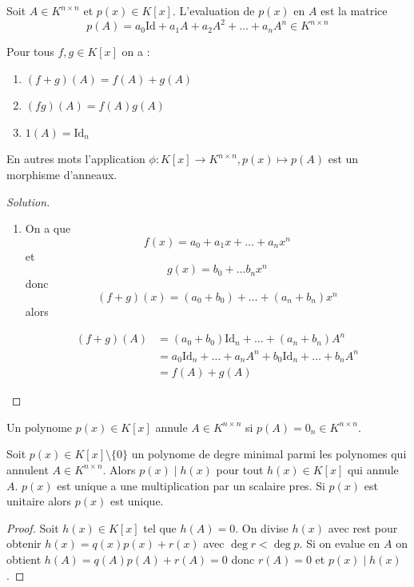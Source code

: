 \begin{definition}
Soit $A\in K^{n\times n}$ et $p(x)\in K[x]$. L'evaluation de $p(x)$ en $A$ est la matrice 
$$
p(A)=a_{0}\mathrm{Id}+a_{1}A+a_{2}A^{2}+\dots+a_{n}A^{n}\in K^{n\times n}
$$
\end{definition}
\begin{exercise}
Pour tous $f,g\in K[x]$ on a :
\begin{enumerate}
\item $(f+g)(A)=f(A)+g(A)$
\item $(fg)(A)=f(A)g(A)$
\item $1(A)=\mathrm{Id}_{n}$
\end{enumerate}
En autres mots l'application $\phi:K[x]\to K^{n\times n},p(x)\mapsto p(A)$ est un morphisme d'anneaux. 
\end{exercise}
\begin{proof}[Solution]
\begin{enumerate}
\item On a que 
$$
f(x)=a_{0}+a_{1}x+\dots +a_{n}x^{n}
$$
et
$$
g(x)=b_{0}+\dots b_{n}x^{n}
$$
donc 
$$
(f+g)(x)=(a_{0}+b_{0})+\dots +(a_{n}+b_{n})x^{n}
$$
alors

\begin{align*}
(f+g)(A) & =(a_{0}+b_{0})\mathrm{Id}_{n}+\dots +(a_{n}+b_{n})A^{n} \\
 & =a_{0}\mathrm{Id}_{n}+\dots +a_{n}A^{n}+b_{0}\mathrm{Id}_{n} +\dots +b_{n}A^{n} \\
 & =f(A)+g(A)
\end{align*}

\end{enumerate}
\end{proof}

\begin{definition}
Un polynome $p(x)\in K[x]$ annule $A\in K^{n\times n}$ si $p(A)=0_{n}\in K^{n\times n}$.
\end{definition}
\begin{theorem}\label{thm2}
Soit $p(x)\in K[x]\setminus \{ 0 \}$ un polynome de degre minimal parmi les polynomes qui annulent $A\in K^{n\times n}$. Alors $p(x)\mid h(x)$ pour tout $h(x)\in K[x]$ qui annule $A$. $p(x)$ est unique a une multiplication par un scalaire pres. Si $p(x)$ est unitaire alors $p(x)$ est unique.  
\end{theorem}
\begin{proof}
Soit $h(x)\in K[x]$ tel que $h(A)=0$. On divise $h(x)$ avec rest pour obtenir $h(x)=q(x)p(x)+r(x)$ avec $\deg r<\deg p$. Si on evalue en $A$ on obtient $h(A)=q(A)p(A)+r(A)=0$ donc $r(A)=0$ et $p(x)\mid h(x)$.
\end{proof}


